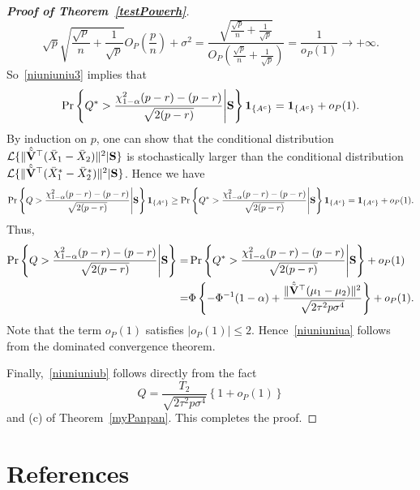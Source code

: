 \documentclass[times,sort&compress,3p]{elsarticle}
\theoremstyle{plain}
\theoremstyle{definition}
\theoremstyle{remark}
\begin{document}
\begin{appendices}
\begin{proof}[\textbf{Proof of Theorem~\ref{testPowerh}}]
$${            \sqrt{p}\sqrt{\frac{\sqrt{p}}{n}+\frac{1}{\sqrt{p}}}
           }{
           O_P\left(\frac{p}{n}\right)+\sigma^2
           }
           =
           \frac{
           \sqrt{\frac{\sqrt{p}}{n}+\frac{1}{\sqrt{p}}}
           }{
               O_P\left(\frac{\sqrt{p}}{n}+\frac{1}{\sqrt{p}}\right)
           }
           =\frac{1}{o_P(1)}\to +\infty.
$$
So~\eqref{niuniuniu3} implies that 
$$
\Pr\left\{Q^*>\frac{\chi^2_{1-\alpha}(p-r)-(p-r)}{\sqrt{2(p-r)}}\Bigg|\mathbf{S}\right\}\mathbf{1}_{\{A^c\}}= \mathbf{1}_{\{A^c\}}+o_P(1).
$$
By induction on $p$, one can show that the conditional distribution $\mathcal{L}\{\|\hat{\tilde{\mathbf{V}}}^\top  (\bar{X}_1-\bar{X}_2)\|^2|\mathbf{S}\}$ is stochastically larger than the conditional distribution $\mathcal{L}\{\|\hat{\tilde{\mathbf{V}}}^\top  (\bar{X}_1^*-\bar{X}_2^*)\|^2|\mathbf{S}\}$.
    Hence we have
    \begin{equation*}
        \Pr\left\{Q>\frac{\chi^2_{1-\alpha}(p-r)-(p-r)}{\sqrt{2(p-r)}}\Bigg|\mathbf{S}\right\}\mathbf{1}_{\{A^c\}}
        \geq 
        \Pr\left\{Q^*>\frac{\chi^2_{1-\alpha}(p-r)-(p-r)}{\sqrt{2(p-r)}}\Bigg|\mathbf{S}\right\}
\mathbf{1}_{\{A^c\}}
        =\mathbf{1}_{\{A^c\}}+o_P(1)
        .
    \end{equation*}
    Thus,
\begin{align*}
    \Pr\left\{Q>\frac{\chi^2_{1-\alpha}(p-r)-(p-r)}{\sqrt{2(p-r)}}\Bigg|\mathbf{S}\right\}
    =&
    \Pr\left\{Q^*>\frac{\chi^2_{1-\alpha}(p-r)-(p-r)}{\sqrt{2(p-r)}}\Bigg|\mathbf{S}\right\}+o_P(1)\\
    =&
    \Phi\left\{-\Phi^{-1}(1-\alpha)+\frac{\|\hat{\tilde{\mathbf{V}}}^\top (\mu_1-\mu_2)\|^2}{\sqrt{2\tau^2 p\sigma^4}}\right\}+o_P(1).
\end{align*}
Note that the term $o_P(1)$ satisfies $|o_P(1)|\leq 2$. Hence~\eqref{niuniuniua} follows from the dominated convergence theorem.

Finally,~\eqref{niuniuniub} follows directly from the fact
$$
Q=\frac{T_2}{\sqrt{2\tau^2 p\sigma^4}}\left\{1+o_P(1)\right\}
$$
and (c) of Theorem~\ref{myPanpan}. This completes the proof.




\end{proof}




\end{appendices}



\section*{References}
\end{document}
